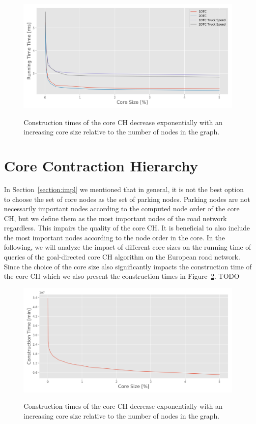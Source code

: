 \begin{figure}[hbtp]
	\centering
	\includegraphics[width=.95\textwidth]{plots/thesis_core_sizes_truck_speed-time_ms.png}
	\label{fig:truck_speed_limit}
	\caption{Construction times of the core CH decrease exponentially with an increasing core size relative to the number of nodes in the graph.}
\end{figure}

\section{Core Contraction Hierarchy}
In Section~\ref{section:impl} we mentioned that in general, it is not the best option to choose the set of core nodes as the set of parking nodes. Parking nodes are not necessarily important nodes according to the computed node order of the core CH, but we define them as the most important nodes of the road network regardless. This impairs the quality of the core CH. It is beneficial to also include the most important nodes according to the node order in the core. In the following, we will analyze the impact of different core sizes on the running time of queries of the goal-directed core CH algorithm on the European road network. Since the choice of the core size also significantly impacts the construction time of the core CH which we also present the construction times in Figure~\ref{fig:preprocessing_time_core_ch}. TODO

\begin{figure}[hbtp]
	\centering
	\includegraphics[width=.95\textwidth]{plots/thesis_core_sizes-csp-parking_europe_hgv-constr_time.png}
	\label{fig:preprocessing_time_core_ch}
	\caption{Construction times of the core CH decrease exponentially with an increasing core size relative to the number of nodes in the graph.}
\end{figure}

